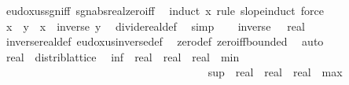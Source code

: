 \begin{isabellebody}
\ eudoxus{\isacharunderscore}{\kern0pt}sgn{\isacharunderscore}{\kern0pt}iff{\isacharparenleft}{\kern0pt}{}{\isacharparenright}{\kern0pt}\ sgn{\isacharunderscore}{\kern0pt}abs{\isacharunderscore}{\kern0pt}real{\isacharunderscore}{\kern0pt}zero{\isacharunderscore}{\kern0pt}iff\ \isamarkupfalse%
\ {\isacharparenleft}{\kern0pt}induct\ x\ rule{\isacharcolon}{\kern0pt}\ slope{\isacharunderscore}{\kern0pt}induct{\isacharparenright}{\kern0pt}\ force\isanewline
\ \ \isamarkupfalse%
\ {\isachardoublequoteopen}x\ {\isacharslash}{\kern0pt}\ y\ {\isacharequal}{\kern0pt}\ x\ {\isacharasterisk}{\kern0pt}\ inverse\ y{\isachardoublequoteclose}\ \isamarkupfalse%
\ divide{\isacharunderscore}{\kern0pt}real{\isacharunderscore}{\kern0pt}def\ \isamarkupfalse%
\ simp\isanewline
\ \ \isamarkupfalse%
\ {\isachardoublequoteopen}inverse\ {\isacharparenleft}{\kern0pt}{}\ {\isacharcolon}{\kern0pt}{\isacharcolon}{\kern0pt}\ real{\isacharparenright}{\kern0pt}\ {\isacharequal}{\kern0pt}\ {}{\isachardoublequoteclose}\ \isamarkupfalse%
\ inverse{\isacharunderscore}{\kern0pt}real{\isacharunderscore}{\kern0pt}def\ eudoxus{\isacharunderscore}{\kern0pt}inverse{\isacharunderscore}{\kern0pt}def\ \isamarkupfalse%
\ zero{\isacharunderscore}{\kern0pt}def\ zero{\isacharunderscore}{\kern0pt}iff{\isacharunderscore}{\kern0pt}bounded{\isacharprime}{\kern0pt}\ \isamarkupfalse%
\ auto\ \isanewline
{}\isamarkupfalse%
%
\endisatagproof
{\isafoldproof}%
%
\isadelimproof
\isanewline
%
\endisadelimproof
\isanewline
{}\isamarkupfalse%
\ real\ {\isacharcolon}{\kern0pt}{\isacharcolon}{\kern0pt}\ distrib{\isacharunderscore}{\kern0pt}lattice\isanewline
{}\isanewline
\isanewline
{}\isamarkupfalse%
\isanewline
\ \ {\isachardoublequoteopen}{\isacharparenleft}{\kern0pt}inf\ {\isacharcolon}{\kern0pt}{\isacharcolon}{\kern0pt}\ real\ {\isasymRightarrow}\ real\ {\isasymRightarrow}\ real{\isacharparenright}{\kern0pt}\ {\isacharequal}{\kern0pt}\ min{\isachardoublequoteclose}\isanewline
\ \ \ \ \ \ \ \ \ \ \ \ \ \ \ \ \ \ \ \ \ \ \ \ \ \ \ \ \ \ \ \ \ \ \ \isanewline
{}\isamarkupfalse%
\isanewline
\ \ {\isachardoublequoteopen}{\isacharparenleft}{\kern0pt}sup\ {\isacharcolon}{\kern0pt}{\isacharcolon}{\kern0pt}\ real\ {\isasymRightarrow}\ real\ {\isasymRightarrow}\ real{\isacharparenright}{\kern0pt}\ {\isacharequal}{\kern0pt}\ max{\isachardoublequoteclose}\isanewline

\end{isabellebody}
